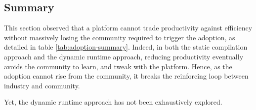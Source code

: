 
\subsection{Summary}

This section observed that a platform cannot trade productivity against efficiency without massively losing the community required to trigger the adoption, as detailed in table \ref{tab:adoption-summary}.
Indeed, in both the static compilation approach and the dynamic runtime approach, reducing productivity eventually avoids the community to learn, and tweak with the platform.
Hence, as the adoption cannot rise from the community, it breaks the reinforcing loop between industry and community.

Yet, the dynamic runtime approach has not been exhaustively explored.












\endinput

